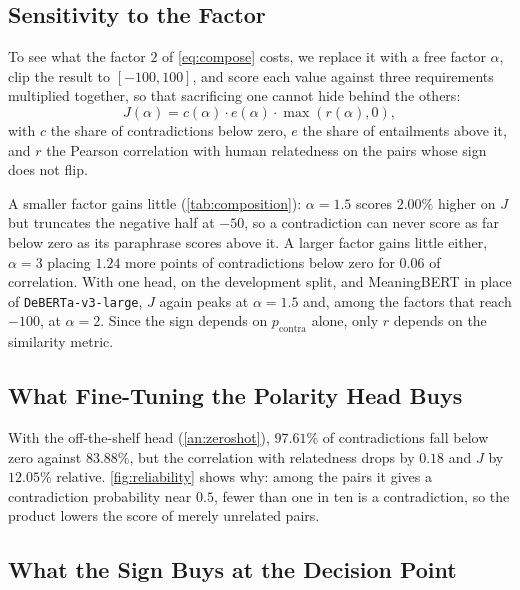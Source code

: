 \documentclass[11pt]{article}
\begin{document}


\subsection{Sensitivity to the Factor}

To see what the factor $2$ of \autoref{eq:compose} costs, we replace it with a free factor $\alpha$, clip the result to $[-100, 100]$, and score each value against three requirements multiplied together, so that sacrificing one cannot hide behind the others:
\begin{equation}
J(\alpha) = c(\alpha) \cdot e(\alpha) \cdot \max\!\left(r(\alpha), 0\right),
\label{eq:objective}
\end{equation}
with $c$ the share of contradictions below zero, $e$ the share of entailments above it, and $r$ the Pearson correlation with human relatedness on the pairs whose sign does not flip.



A smaller factor gains little (\autoref{tab:composition}): $\alpha = 1.5$ scores $2.00\%$ higher on $J$ but truncates the negative half at $-50$, so a contradiction can never score as far below zero as its paraphrase scores above it.
A larger factor gains little either, $\alpha = 3$ placing $1.24$ more points of contradictions below zero for $0.06$ of correlation.
With one head, on the development split, and MeaningBERT in place of \texttt{DeBERTa-v3-large}, $J$ again peaks at $\alpha = 1.5$ and, among the factors that reach $-100$, at $\alpha = 2$.
Since the sign depends on $p_{\mathrm{contra}}$ alone, only $r$ depends on the similarity metric.

\subsection{What Fine-Tuning the Polarity Head Buys}

With the off-the-shelf head (\autoref{an:zeroshot}), $97.61\%$ of contradictions fall below zero against $83.88\%$, but the correlation with relatedness drops by $0.18$ and $J$ by $12.05\%$ relative.
\autoref{fig:reliability} shows why: among the pairs it gives a contradiction probability near $0.5$, fewer than one in ten is a contradiction, so the product lowers the score of merely unrelated pairs.



\subsection{What the Sign Buys at the Decision Point}
\end{document}
